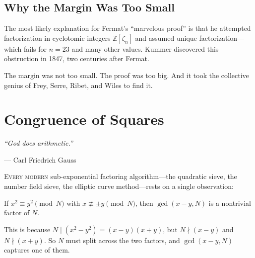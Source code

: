 \documentclass[11pt,twoside,openright]{book}
\theoremstyle{definition}
\newcommand{\Z}{\mathbb{Z}}
\begin{document}
\section{Why the Margin Was Too Small}

The most likely explanation for Fermat's ``marvelous proof'' is that he
attempted factorization in cyclotomic integers $\Z[\zeta_n]$ and assumed
unique factorization---which fails for $n = 23$ and many other values.
Kummer discovered this obstruction in 1847, two centuries after Fermat.

The margin was not too small. The proof was too big. And it took the
collective genius of Frey, Serre, Ribet, and Wiles to find it.

\chapter{Congruence of Squares}
\label{ch:congruence}

\epigraph{\itshape ``God does arithmetic.''}
{--- Carl Friedrich Gauss}

\lettrine[lines=3]{E}{very modern} sub-exponential factoring algorithm---the
quadratic sieve, the number field sieve, the elliptic curve method---rests
on a single observation:

\begin{insightbox}
If $x^2 \equiv y^2 \pmod{N}$ with $x \not\equiv \pm y \pmod{N}$,
then $\gcd(x - y, N)$ is a nontrivial factor of $N$.
\end{insightbox}

This is because $N \mid (x^2 - y^2) = (x-y)(x+y)$, but $N \nmid (x-y)$
and $N \nmid (x+y)$. So $N$ must split across the two factors, and
$\gcd(x-y, N)$ captures one of them.
\end{document}
